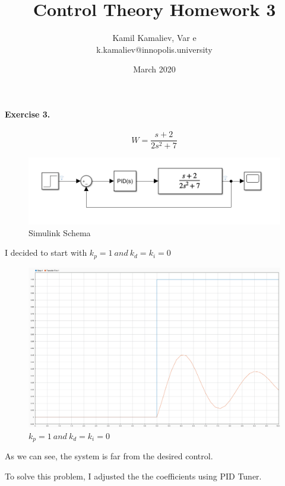 \documentclass{article}
\title{Control Theory Homework 3}
\author{Kamil Kamaliev, Var e \\ k.kamaliev@innopolis.university}
\date{March 2020}
\begin{document}
\maketitle

\paragraph{Exercise 3.}

$$ W = \frac{s + 2}{2s^2 + 7} $$

\begin{figure}[hbt!]
        \centering
        \includegraphics[scale=0.4]{hw3_3schema.png}
        \caption{Simulink Schema}
\end{figure}

I decided to start with $k_p = 1 \ and \ k_d = k_i = 0$

\begin{figure}[hbt!]
        \centering
        \includegraphics[scale=0.2]{hw3_3no_cont.png}
        \caption{$k_p = 1 \ and \ k_d = k_i = 0$}
\end{figure}

As we can see, the system is far from the desired control.

To solve this problem, I adjusted the the coefficients using PID Tuner.

\newpage
\end{document}
